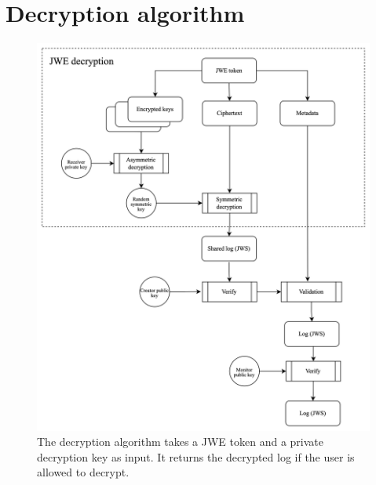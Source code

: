 \documentclass[../main.tex]{subfiles}
\begin{document}
\section{Decryption algorithm}
\label{app:decryption}
\begin{figure}[h]
    \includegraphics[scale=0.13]{../img/05/decrypt_logs.jpg}
    \centering
    \caption{The decryption algorithm takes a JWE token and a private decryption key as input. It returns the decrypted log if the user is allowed to decrypt.}
    \label{app:decryption_algo}
\end{figure}
\end{document}
